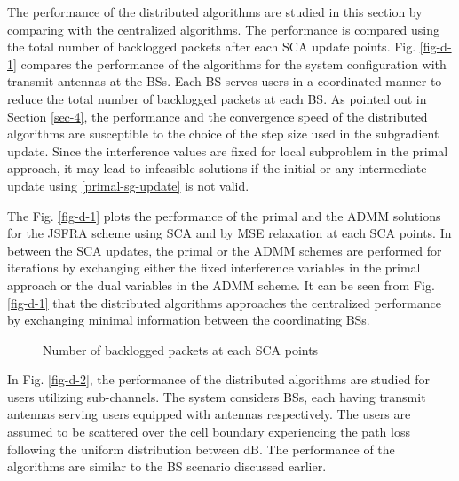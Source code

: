 
The performance of the distributed algorithms are studied in this section by comparing with the centralized algorithms. The performance is compared using the total number of backlogged packets after each \ac{SCA} update points. Fig. \ref{fig-d-1} compares the performance of the algorithms for the system configuration  with  transmit antennas at the \acp{BS}. Each \ac{BS} serves  users in a coordinated manner to reduce the total number of backlogged packets at each \ac{BS}. As pointed out in Section \ref{sec-4}, the performance and the convergence speed of the distributed algorithms are susceptible to the choice of the step size used in the subgradient update. Since the interference values are fixed for local subproblem in the primal approach, it may lead to infeasible solutions if the initial or any intermediate update using \eqref{primal-sg-update} is not valid.

The Fig. \ref{fig-d-1} plots the performance of the primal and the \ac{ADMM} solutions for the \ac{JSFRA} scheme using \ac{SCA} and by \ac{MSE} relaxation at each \ac{SCA} points. In between the \ac{SCA} updates, the primal or the \ac{ADMM} schemes are performed for  iterations by exchanging either the fixed interference variables in the primal approach or the dual variables in the \ac{ADMM} scheme. It can be seen from Fig. \ref{fig-d-1} that the distributed algorithms approaches the centralized performance by exchanging minimal information between the coordinating \acp{BS}.
\begin{figure*}
\centering
{}
\hfill
{}
\caption{Number of backlogged packets at each \ac{SCA} points}
\label{fig-d}
\end{figure*}

In Fig. \ref{fig-d-2}, the performance of the distributed algorithms are studied for  users utilizing  sub-channels. The system considers  \acp{BS}, each having  transmit antennas serving  users equipped with  antennas respectively. The users are assumed to be scattered over the cell boundary experiencing the path loss following the uniform distribution between \me{[0,-6]} dB. The performance of the algorithms are similar to the  \ac{BS} scenario discussed earlier.

